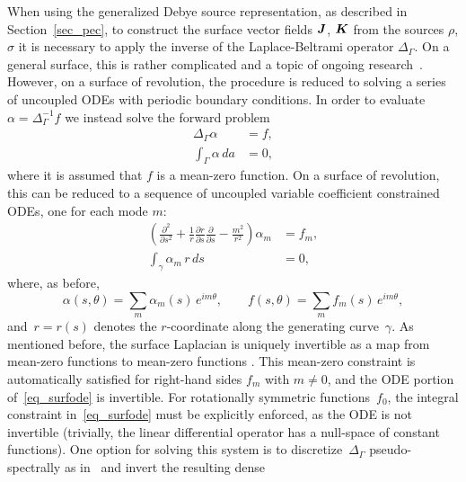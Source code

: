 \documentclass[11pt]{article}
\newcommand{\vct}{\vectorsym}
\newcommand{\surflap}{\Delta_\Gamma}
\newcommand{\bJ}{\vct{ J}}
\newcommand{\bK}{\vct{ K}}
\numberwithin{equation}{section}
\begin{document}
When using the generalized Debye source representation, as described
in Section~\ref{sec_pec}, to construct the surface vector fields
$\bJ$, $\bK$ from the sources $\rho$, $\sigma$ it is necessary to
apply the inverse of the Laplace-Beltrami operator $\surflap$. On a
general surface, this is rather complicated and a topic of ongoing
research~\cite{imbertgerard_2017,frittelli_2016,oneil2017}.
However, on a surface of revolution, the
procedure is reduced to solving a series of uncoupled ODEs with
periodic boundary conditions.
In order
to evaluate $\alpha = \surflap^{-1} f$ we instead solve the forward
problem
\begin{equation} \label{eq_integrodiff}
\begin{aligned}
\surflap \alpha &= f, \\
\int_\Gamma \alpha \, da &= 0,
\end{aligned}
\end{equation}
where it is assumed that $f$ is a mean-zero function.
On a surface of revolution, this can be reduced to a sequence of
uncoupled variable coefficient constrained ODEs, one for each mode
$m$:
\begin{equation}\label{eq_surfode}
\begin{aligned}
\left( \frac{\partial^2 }{\partial s^2} + 
\frac{1}{r} \frac{\partial r}{\partial s} \frac{\partial }{\partial
  s} - \frac{m^2}{r^2} \right)\alpha_m &= f_m, \\
\int_\gamma \alpha_m \, r \, ds &= 0,
\end{aligned}
\end{equation}
where, as before,
\begin{equation}
  \alpha(s,\theta) = \sum_m \alpha_m(s) \, e^{im\theta}, \qquad
  f(s,\theta) = \sum_m f_m(s) \, e^{im\theta},
\end{equation}
and~$r = r(s)$ denotes the $r$-coordinate along the generating
curve~$\gamma$.  As mentioned before, the surface Laplacian is
uniquely invertible as a map from mean-zero functions
to mean-zero functions \cite{EpGr}.  This mean-zero constraint is
automatically satisfied for right-hand sides $f_m$ with $m \neq 0$,
and the ODE portion of~\eqref{eq_surfode} is invertible.  For
rotationally symmetric functions~$f_0$, the integral constraint
in~\eqref{eq_surfode} must be explicitly enforced, as the ODE is not
invertible (trivially, the linear differential operator has a
null-space of constant functions).  One option for solving this system
is to discretize~$\surflap$ pseudo-spectrally as
in~\cite{imbertgerard_2017} and invert the resulting dense
\end{document}

